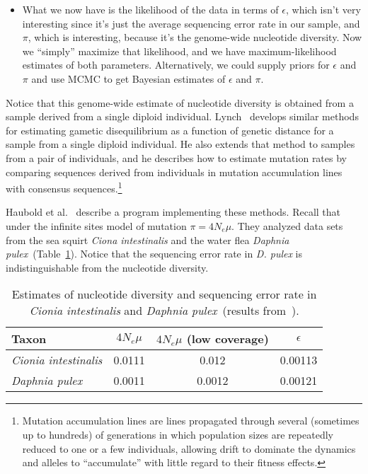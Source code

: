 \documentclass[12pt]{article}
\begin{document}
\begin{itemize}
\item What we now have is the likelihood of the data in terms of
  $\epsilon$, which isn't very interesting since it's just the average
  sequencing error rate in our sample, and $\pi$, which is
  interesting, because it's the genome-wide nucleotide diversity. Now
  we ``simply'' maximize that likelihood, and we have
  maximum-likelihood estimates of both parameters. Alternatively, we
  could supply priors for $\epsilon$ and $\pi$ and use MCMC to get
  Bayesian estimates of $\epsilon$ and $\pi$.  

\end{itemize}

Notice that this genome-wide estimate of nucleotide diversity is
obtained from a sample derived from a single diploid
individual. Lynch~\cite{Lynch-2008} develops similar methods for
estimating gametic disequilibrium as a function of genetic distance
for a sample from a single diploid individual. He also extends that
method to samples from a pair of individuals, and he describes how to
estimate mutation rates by comparing sequences derived from
individuals in mutation accumulation lines with consensus
sequences.\footnote{Mutation accumulation lines are lines propagated
  through several (sometimes up to hundreds) of generations in which
  population sizes are repeatedly reduced to one or a few individuals,
  allowing drift to dominate the dynamics and alleles to
  ``accumulate'' with little regard to their fitness effects.}

Haubold et al.~\cite{Haubold-etal-2010} describe a program
implementing these methods. Recall that under the infinite sites model
of mutation $\pi = 4N_e\mu$. They analyzed data sets from the sea
squirt {\it Ciona intestinalis\/} and the water flea {\it Daphnia
  pulex}~(Table~\ref{table:NGS-results}). Notice that the sequencing
error rate in {\it D. pulex} is indistinguishable from the nucleotide
diversity.

\begin{table}
\begin{center}
\begin{tabular}{lccc}
\hline\hline
Taxon & $4N_e\mu$ & $4N_e\mu$ (low coverage) & $\epsilon$ \\
\hline
{\it Cionia intestinalis} & 0.0111 & 0.012 & 0.00113 \\
{\it Daphnia pulex} & 0.0011 & 0.0012 & 0.00121 \\
\hline
\end{tabular}
\end{center}
\caption{Estimates of nucleotide diversity and sequencing error rate
  in {\it Cionia intestinalis\/} and {\it Daphnia pulex}~(results
  from~\cite{Haubold-etal-2010}).}\label{table:NGS-results}
\end{table}
\end{document}
